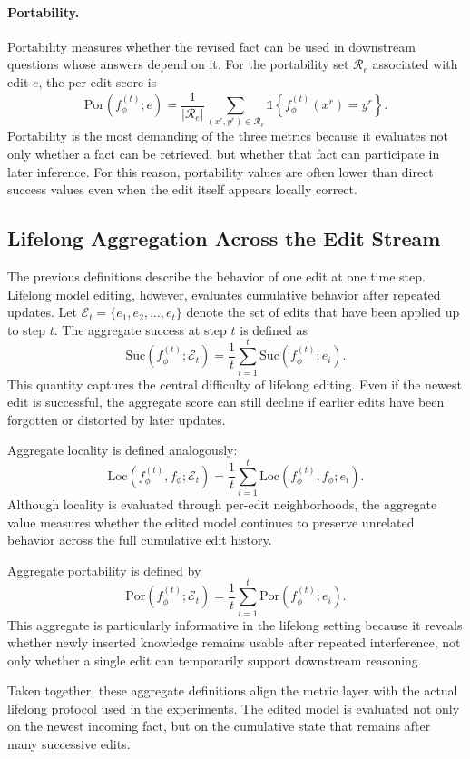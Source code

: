 \paragraph{Portability.} Portability measures whether the revised fact can be used in downstream questions whose answers depend on it. For the portability set $\mathcal{R}_e$ associated with edit $e$, the per-edit score is
\begin{equation}
\mathrm{Por}(f_{\phi}^{(t)}; e)
= \frac{1}{|\mathcal{R}_e|}
\sum_{(x^r, y^r) \in \mathcal{R}_e}
\mathds{1}\left\{ f_{\phi}^{(t)}(x^r) = y^r \right\}.
\end{equation}
Portability is the most demanding of the three metrics because it evaluates not only whether a fact can be retrieved, but whether that fact can participate in later inference. For this reason, portability values are often lower than direct success values even when the edit itself appears locally correct.

\subsection{Lifelong Aggregation Across the Edit Stream}

The previous definitions describe the behavior of one edit at one time step. Lifelong model editing, however, evaluates cumulative behavior after repeated updates. Let $\mathcal{E}_t = \{e_1, e_2, \ldots, e_t\}$ denote the set of edits that have been applied up to step $t$. The aggregate success at step $t$ is defined as
\begin{equation}
\mathrm{Suc}(f_{\phi}^{(t)}; \mathcal{E}_t)
= \frac{1}{t}
\sum_{i=1}^{t}
\mathrm{Suc}(f_{\phi}^{(t)}; e_i).
\end{equation}
This quantity captures the central difficulty of lifelong editing. Even if the newest edit is successful, the aggregate score can still decline if earlier edits have been forgotten or distorted by later updates.

Aggregate locality is defined analogously:
\begin{equation}
\mathrm{Loc}(f_{\phi}^{(t)}, f_{\phi}; \mathcal{E}_t)
= \frac{1}{t}
\sum_{i=1}^{t}
\mathrm{Loc}(f_{\phi}^{(t)}, f_{\phi}; e_i).
\end{equation}
Although locality is evaluated through per-edit neighborhoods, the aggregate value measures whether the edited model continues to preserve unrelated behavior across the full cumulative edit history.

Aggregate portability is defined by
\begin{equation}
\mathrm{Por}(f_{\phi}^{(t)}; \mathcal{E}_t)
= \frac{1}{t}
\sum_{i=1}^{t}
\mathrm{Por}(f_{\phi}^{(t)}; e_i).
\end{equation}
This aggregate is particularly informative in the lifelong setting because it reveals whether newly inserted knowledge remains usable after repeated interference, not only whether a single edit can temporarily support downstream reasoning.

Taken together, these aggregate definitions align the metric layer with the actual lifelong protocol used in the experiments. The edited model is evaluated not only on the newest incoming fact, but on the cumulative state that remains after many successive edits.
